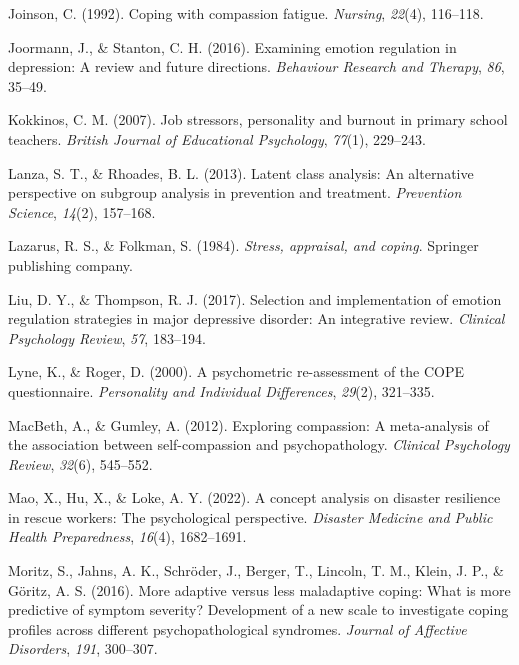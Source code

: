 \documentclass[
  man]{apa6}
\newlength{\cslhangindent}
\newlength{\cslentryspacingunit} %
\newenvironment{CSLReferences}[2] %
 {%
  \setlength{\parindent}{0pt}
  \ifodd #1
  \let\oldpar\par
  \def\par{\hangindent=\cslhangindent\oldpar}
  \fi
  \setlength{\parskip}{#2\cslentryspacingunit}
 }%
 {}
\begin{document}
\begin{CSLReferences}{1}{0}
\leavevmode{}%
Joinson, C. (1992). Coping with compassion fatigue. \emph{Nursing}, \emph{22}(4), 116--118.

\leavevmode{}%
Joormann, J., \& Stanton, C. H. (2016). Examining emotion regulation in depression: A review and future directions. \emph{Behaviour Research and Therapy}, \emph{86}, 35--49.

\leavevmode{}%
Kokkinos, C. M. (2007). Job stressors, personality and burnout in primary school teachers. \emph{British Journal of Educational Psychology}, \emph{77}(1), 229--243.

\leavevmode{}%
Lanza, S. T., \& Rhoades, B. L. (2013). Latent class analysis: An alternative perspective on subgroup analysis in prevention and treatment. \emph{Prevention Science}, \emph{14}(2), 157--168.

\leavevmode{}%
Lazarus, R. S., \& Folkman, S. (1984). \emph{Stress, appraisal, and coping}. Springer publishing company.

\leavevmode{}%
Liu, D. Y., \& Thompson, R. J. (2017). Selection and implementation of emotion regulation strategies in major depressive disorder: An integrative review. \emph{Clinical Psychology Review}, \emph{57}, 183--194.

\leavevmode{}%
Lyne, K., \& Roger, D. (2000). A psychometric re-assessment of the COPE questionnaire. \emph{Personality and Individual Differences}, \emph{29}(2), 321--335.

\leavevmode{}%
MacBeth, A., \& Gumley, A. (2012). Exploring compassion: A meta-analysis of the association between self-compassion and psychopathology. \emph{Clinical Psychology Review}, \emph{32}(6), 545--552.

\leavevmode{}%
Mao, X., Hu, X., \& Loke, A. Y. (2022). A concept analysis on disaster resilience in rescue workers: The psychological perspective. \emph{Disaster Medicine and Public Health Preparedness}, \emph{16}(4), 1682--1691.

\leavevmode{}%
Moritz, S., Jahns, A. K., Schröder, J., Berger, T., Lincoln, T. M., Klein, J. P., \& Göritz, A. S. (2016). More adaptive versus less maladaptive coping: What is more predictive of symptom severity? Development of a new scale to investigate coping profiles across different psychopathological syndromes. \emph{Journal of Affective Disorders}, \emph{191}, 300--307.


\end{CSLReferences}
\end{document}
